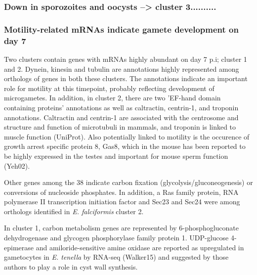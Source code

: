 \documentclass{bmcart}
\begin{document}
\subsubsection*{Down in sporozoites and oocysts -->  cluster 3..........}




\subsubsection*{Motility-related mRNAs indicate gamete development on day 7}
Two clusters contain genes with mRNAs highly abundant on day 7 p.i; cluster 1 and 2.
Dynein, kinesin and tubulin are annotations highly represented among orthologs of genes 
in both these clusters. The annotations indicate an important role for motility at this
timepoint, probably reflecting development of microgametes.
In addition, in cluster 2, there are two 'EF-hand domain containing proteins' annotations as well 
as caltractin, centrin-1, and troponin annotations. Caltractin and 
centrin-1 are associated with the centrosome and structure and function of microtubuli in mammals, 
and troponin is linked to muscle function (UniProt). 
Also potentially linked to motility is the occurence of growth arrest specific protein 8,
Gas8, which in the mouse has been reported to be highly 
expressed in the testes and important for mouse sperm function (Yeh02). 

Other genes among the 38 indicate carbon fixation (glycolysis/gluconeogenesis) or 
conversions of nucleoside phosphates. In addition, a Ras family protein, RNA 
polymerase II transcription initiation factor and Sec23 and Sec24 were among orthologs 
identified in \textit{E. falciformis} cluster 2.

In cluster 1, carbon metabolism genes are represented by 6-phosphogluconate dehydrogenase 
and glycogen phosphorylase family protein 1. UDP-glucose 4-epimerase and amiloride-sensitive 
amine oxidase are reported as upregulated in gametocytes in \textit{E. tenella} by 
RNA-seq (Walker15) and suggested by those authors to play a role in cyst wall synthesis.
\end{document}
